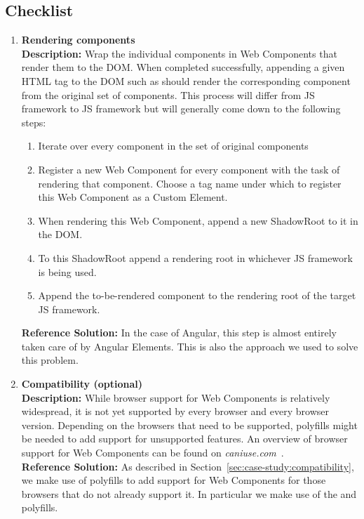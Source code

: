 \subsection{Checklist}
\begin{enumerate}
	\item \textbf{Rendering components}\\
	      \textbf{Description:} Wrap the individual components in Web Components that render them to the DOM. When completed successfully, appending a given HTML tag to the DOM such as  should render the corresponding component from the original set of components. This process will differ from JS framework to JS framework but will generally come down to the following steps:
	      \begin{enumerate}
		      \item Iterate over every component in the set of original components
		      \item Register a new Web Component for every component with the task of rendering that component. Choose a tag name under which to register this Web Component as a Custom Element.
		      \item When rendering this Web Component, append a new ShadowRoot to it in the DOM.
		      \item To this ShadowRoot append a rendering root in whichever JS framework is being used.
		      \item Append the to-be-rendered component to the rendering root of the target JS framework.
	      \end{enumerate}
	      \textbf{Reference Solution:} In the case of Angular, this step is almost entirely taken care of by Angular Elements. This is also the approach we used to solve this problem.
	\item \textbf{Compatibility (optional)} \\
	      \textbf{Description:} While browser support for Web Components is relatively widespread, it is not yet supported by every browser and every browser version. Depending on the browsers that need to be supported, polyfills might be needed to add support for unsupported features. An overview of browser support for Web Components can be found on \emph{caniuse.com}~.\\
	      \textbf{Reference Solution:} As described in Section~\ref{sec:case-study:compatibility}, we make use of polyfills to add support for Web Components for those browsers that do not already support it. In particular we make use of the  and  polyfills.

\end{enumerate}
